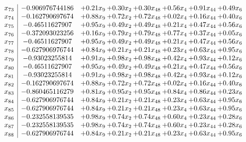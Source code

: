 \documentclass[8pt]{article}
\begin{document}
\[\begin{array}{c| c c@{\hskip 2pt} c@{\hskip 2pt} c@{\hskip 2pt} c@{\hskip 2pt} c@{\hskip 2pt} c@{\hskip 2pt} }
 x_{73}   &  -0.906976744186 & +  0.21 x_{9} & +  0.30 x_{2} & +  0.30 x_{48} & +  0.56 x_{4} & +  0.91 x_{44} & +  0.49 x_{6}\\
 x_{74}   &  -0.162790697674 & +  0.88 x_{9} & +  0.72 x_{2} & +  0.72 x_{48} & +  0.02 x_{4} & +  0.16 x_{44} & +  0.40 x_{6}\\
 x_{75}   &  -0.46511627907 & +  0.95 x_{9} & +  0.49 x_{2} & +  0.49 x_{48} & +  0.21 x_{4} & +  0.47 x_{44} & +  0.56 x_{6}\\
 x_{76}   &  -0.372093023256 & +  0.16 x_{9} & +  0.79 x_{2} & +  0.79 x_{48} & +  0.77 x_{4} & +  0.37 x_{44} & +  0.05 x_{6}\\
 x_{77}   &  -0.46511627907 & +  0.95 x_{9} & +  0.49 x_{2} & +  0.49 x_{48} & +  0.21 x_{4} & +  0.47 x_{44} & +  0.56 x_{6}\\
 x_{78}   &  -0.627906976744 & +  0.84 x_{9} & +  0.21 x_{2} & +  0.21 x_{48} & +  0.23 x_{4} & +  0.63 x_{44} & +  0.95 x_{6}\\
 x_{79}   &  -0.93023255814 & +  0.91 x_{9} & +  0.98 x_{2} & +  0.98 x_{48} & +  0.42 x_{4} & +  0.93 x_{44} & +  0.12 x_{6}\\
 x_{80}   &  -0.46511627907 & +  0.95 x_{9} & +  0.49 x_{2} & +  0.49 x_{48} & +  0.21 x_{4} & +  0.47 x_{44} & +  0.56 x_{6}\\
 x_{81}   &  -0.93023255814 & +  0.91 x_{9} & +  0.98 x_{2} & +  0.98 x_{48} & +  0.42 x_{4} & +  0.93 x_{44} & +  0.12 x_{6}\\
 x_{82}   &  -0.162790697674 & +  0.88 x_{9} & +  0.72 x_{2} & +  0.72 x_{48} & +  0.02 x_{4} & +  0.16 x_{44} & +  0.40 x_{6}\\
 x_{83}   &  -0.860465116279 & +  0.81 x_{9} & +  0.95 x_{2} & +  0.95 x_{48} & +  0.84 x_{4} & +  0.86 x_{44} & +  0.23 x_{6}\\
 x_{84}   &  -0.627906976744 & +  0.84 x_{9} & +  0.21 x_{2} & +  0.21 x_{48} & +  0.23 x_{4} & +  0.63 x_{44} & +  0.95 x_{6}\\
 x_{85}   &  -0.627906976744 & +  0.84 x_{9} & +  0.21 x_{2} & +  0.21 x_{48} & +  0.23 x_{4} & +  0.63 x_{44} & +  0.95 x_{6}\\
 x_{86}   &  -0.232558139535 & +  0.98 x_{9} & +  0.74 x_{2} & +  0.74 x_{48} & +  0.60 x_{4} & +  0.23 x_{44} & +  0.28 x_{6}\\
 x_{87}   &  -0.232558139535 & +  0.98 x_{9} & +  0.74 x_{2} & +  0.74 x_{48} & +  0.60 x_{4} & +  0.23 x_{44} & +  0.28 x_{6}\\
 x_{88}   &  -0.627906976744 & +  0.84 x_{9} & +  0.21 x_{2} & +  0.21 x_{48} & +  0.23 x_{4} & +  0.63 x_{44} & +  0.95 x_{6}\\

\end{array}\]
\end{document}
